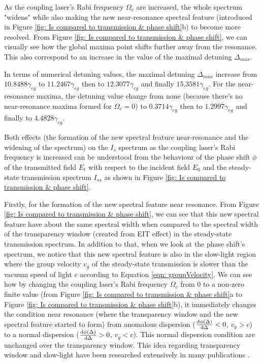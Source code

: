 As the coupling laser's Rabi frequency $\Omega_{c}$ are increased, the whole spectrum "widens" while also making the new near-resonance spectral feature (introduced in Figure \ref{fig: Is compared to transmission & phase shift}b) to become more resolved. From Figure \ref{fig: Is compared to transmission & phase shift}, we can visually see how the global maxima point shifts further away from the resonance. This also correspond to an increase in the value of the maximal detuning $\Delta_{max}$.

In terms of numerical detuning values, the maximal detuning $\Delta_{max}$ increase from $10.8488\gamma_{eg}$ to $11.2467\gamma_{eg}$ then to $12.3077\gamma_{eg}$ and finally $15.3581\gamma_{eg}$. For the near-resonance maxima, the detuning value change from none (because there's no near-resonance maxima formed for $\Omega_{c} = 0$) to $0.3714\gamma_{eg}$ then to $1.2997\gamma_{eg}$ and finally to $4.4828\gamma_{eg}$.

Both effects (the formation of the new spectral feature near-resonance and the widening of the spectrum) on the $I_{s}$ spectrum as the coupling laser's Rabi frequency is increased  can be understood from the behaviour of the phase shift $\phi$ of the transmitted field $E_{t}$ with respect to the incident field $E_{0}$ and the steady-state transmission spectrum $I_{ss}$ as shown in Figure \ref{fig: Is compared to transmission & phase shift}.

Firstly, for the formation of the new spectral feature near resonance. From Figure \ref{fig: Is compared to transmission & phase shift}, we can see that this new spectral feature have about the same spectral width when compared to the spectral width of the transparency window (created from EIT effect) in the steady-state transmission spectrum. In addition to that, when we look at the phase shift's spectrum, we notice that this new spectral feature is also in the slow-light region where the group velocity $v_{g}$ of the steady-state transmission is slower than the vacuum speed of light $c$ according to Equation \ref{eqn: groupVelocity}. We can see how by changing the coupling laser's Rabi frequency $\Omega_{c}$ from $0$ to a non-zero finite value (from Figure \ref{fig: Is compared to transmission & phase shift}a to Figure \ref{fig: Is compared to transmission & phase shift}b), it immediately changes the condition near resonance (where the transparency window and the new spectral feature started to form) from anomalous dispersion ($\dv{\phi(\Delta)}{\Delta} < 0$, $v_{g} > c$) to a normal dispersion ($\dv{\phi(\Delta)}{\Delta} > 0$, $v_{g} < c$). This normal dispersion condition are unchanged over the transparency window. This idea regarding transparency window and slow-light have been researched extensively in many publications \cite{jeong2010slow, MacKe2009, Jeong2009, MacKe2009, Braje2004}.

